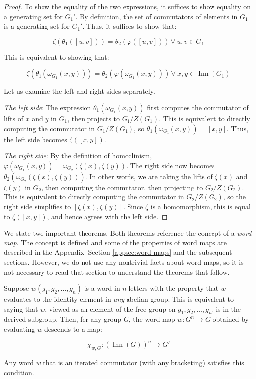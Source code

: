 \documentclass{ucetd}
\begin{document}
\begin{proof}
  To show the equality of the two expressions, it suffices to show
  equality on a generating set for $G_1'$. By definition, the set of
  commutators of elements in $G_1$ is a generating set for
  $G_1'$. Thus, it suffices to show that:

  $$\zeta(\theta_1([u,v])) = \theta_2(\varphi([u,v])) \ \forall \ u,v \in G_1$$

  This is equivalent to showing that:

  $$\zeta(\theta_1(\omega_{G_1}(x,y))) = \theta_2(\varphi(\omega_{G_1}(x,y))) \ \forall \ x,y \in \operatorname{Inn}(G_1)$$

  Let us examine the left and right sides separately. 

  {\em The left side}: The expression $\theta_1(\omega_{G_1}(x,y))$
  first computes the commutator of lifts of $x$ and $y$ in $G_1$, then
  projects to $G_1/Z(G_1)$. This is equivalent to directly computing
  the commutator in $G_1/Z(G_1)$, so $\theta_1(\omega_{G_1}(x,y)) =
  [x,y]$. Thus, the left side becomes $\zeta([x,y])$.

  {\em The right side}: By the definition of homoclinism,
  $\varphi(\omega_{G_1}(x,y)) = \omega_{G_2}(\zeta(x),\zeta(y))$. The
  right side now becomes
  $\theta_2(\omega_{G_2}(\zeta(x),\zeta(y)))$. In other words, we are
  taking the lifts of $\zeta(x)$ and $\zeta(y)$ in $G_2$, then
  computing the commutator, then projecting to $G_2/Z(G_2)$. This is
  equivalent to directly computing the commutator in $G_2/Z(G_2)$, so
  the right side simplifies to $[\zeta(x),\zeta(y)]$. Since $\zeta$ is
  a homomorphism, this is equal to $\zeta([x,y])$, and hence agrees
  with the left side.
\end{proof}

We state two important theorems. Both theorems reference the concept
of a {\em word map}. The concept is defined and some of the properties
of word maps are described in the Appendix, Section
\ref{appsec:word-maps} and the subsequent sections. However, we do not
use any nontrivial facts about word maps, so it is not necessary to
read that section to understand the theorems that follow.

\begin{theorem}\label{thm:iterated-commutator-descends-to-inn}
  Suppose $w(g_1,g_2,\dots,g_n)$ is a word in $n$ letters with the
  property that $w$ evaluates to the identity element in {\em any}
  abelian group. This is equivalent to saying that $w$, viewed as an
  element of the free group on $g_1,g_2,\dots,g_n$, is in the derived
  subgroup. Then, for any group $G$, the word map $w:G^n \to G$ obtained
  by evaluating $w$ descends to a map:

  $$\chi_{w,G}: (\operatorname{Inn}(G))^n  \to G'$$

  Any word $w$ that is an iterated commutator (with any bracketing)
  satisfies this condition.
\end{theorem}
\end{document}

